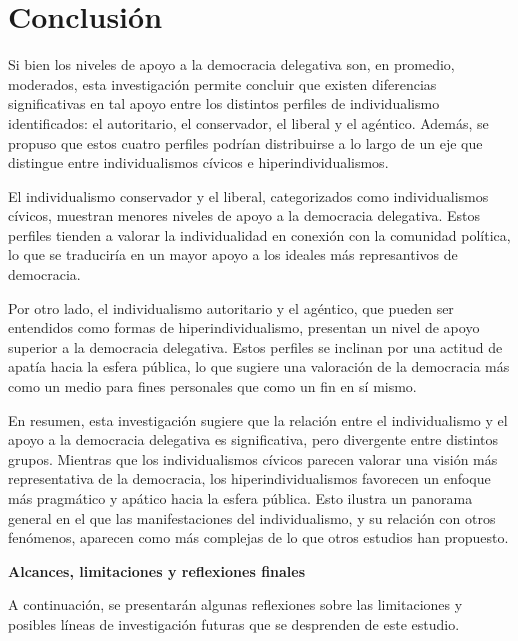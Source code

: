 \documentclass[12pt,twoside]{templates/facsothesis}
\begin{document}
\hypertarget{conclusiuxf3n}{%
\chapter{Conclusión}\label{conclusiuxf3n}}

Si bien los niveles de apoyo a la democracia delegativa son, en promedio, moderados, esta investigación permite concluir que existen diferencias significativas en tal apoyo entre los distintos perfiles de individualismo identificados: el autoritario, el conservador, el liberal y el agéntico. Además, se propuso que estos cuatro perfiles podrían distribuirse a lo largo de un eje que distingue entre individualismos cívicos e hiperindividualismos.

El individualismo conservador y el liberal, categorizados como individualismos cívicos, muestran menores niveles de apoyo a la democracia delegativa. Estos perfiles tienden a valorar la individualidad en conexión con la comunidad política, lo que se traduciría en un mayor apoyo a los ideales más represantivos de democracia.

Por otro lado, el individualismo autoritario y el agéntico, que pueden ser entendidos como formas de hiperindividualismo, presentan un nivel de apoyo superior a la democracia delegativa. Estos perfiles se inclinan por una actitud de apatía hacia la esfera pública, lo que sugiere una valoración de la democracia más como un medio para fines personales que como un fin en sí mismo.

En resumen, esta investigación sugiere que la relación entre el individualismo y el apoyo a la democracia delegativa es significativa, pero divergente entre distintos grupos. Mientras que los individualismos cívicos parecen valorar una visión más representativa de la democracia, los hiperindividualismos favorecen un enfoque más pragmático y apático hacia la esfera pública. Esto ilustra un panorama general en el que las manifestaciones del individualismo, y su relación con otros fenómenos, aparecen como más complejas de lo que otros estudios han propuesto.

\textbf{Alcances, limitaciones y reflexiones finales}

A continuación, se presentarán algunas reflexiones sobre las limitaciones y posibles líneas de investigación futuras que se desprenden de este estudio.
\end{document}
